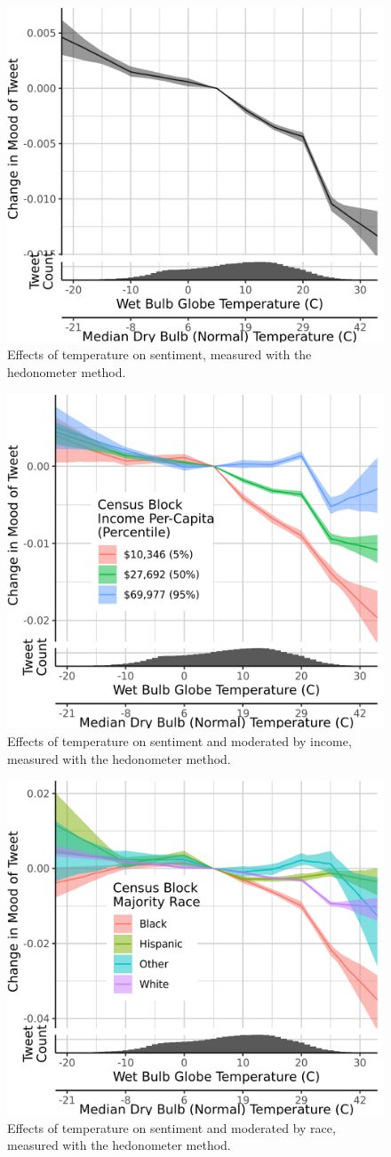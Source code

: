 \documentclass{article}
\begin{document}
\begin{figure}[H]
  \centering
  \includegraphics[width=0.6\linewidth]{../res/hedono-wbgt.png}
  \caption{Effects of temperature on sentiment, measured with the hedonometer method.}
\end{figure}

\begin{figure}[H]
  \centering
  \includegraphics[width=0.6\linewidth]{../res/hedono-wbgt-income.png}
  \caption{Effects of temperature on sentiment and moderated by income, measured with the hedonometer method.}
\end{figure}

\begin{figure}[H]
  \centering
  \includegraphics[width=0.6\linewidth]{../res/hedono-wbgt-race_q.png}
  \caption{Effects of temperature on sentiment and moderated by race, measured with the hedonometer method.}
\end{figure}
\end{document}
